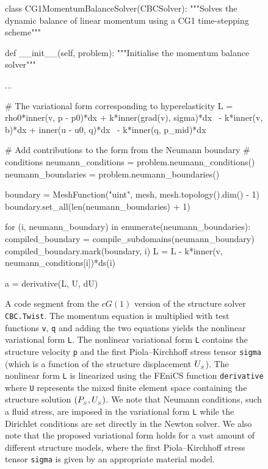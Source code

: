 \begin{figure}
\label{selim:fig:structuresolver}
\caption{A code segment from the $cG(1)$ version of the structure
  solver \texttt{CBC.Twist}.  The momentum equation is multiplied with
  test functions \texttt{v}, \texttt{q} and adding the two equations
  yields the nonlinear variational form \texttt{L}. The nonlinear
  variational form \texttt{L} contains the structure velocity
  \texttt{p} and the first Piola--Kirchhoff stress tensor
  \texttt{sigma} (which is a function of the structure
  displacement $U_{_{S}}$).  The nonlinear form \texttt{L} is
  linearized using the FEniCS function \texttt{derivative} where
  \texttt{U} represents the mixed finite element space containing the
  structure solution $(P_{_{S}}, U_{_{S}})$.  We note that Neumann
  conditions, such a fluid stress, are imposed in the variational form
  \texttt{L} while the Dirichlet conditions are set directly in the
  Newton solver. We also note that the proposed variational form holds
  for a vast amount of different structure models, where the first
  Piola--Kirchhoff stress tensor \texttt{sigma} is given by an
  appropriate material model.  }
\begin{python}
class CG1MomentumBalanceSolver(CBCSolver):
    """Solves the dynamic balance of linear momentum using a CG1
    time-stepping scheme"""

    def __init__(self, problem):
        """Initialise the momentum balance solver"""
   
        ...

        # The variational form corresponding to hyperelasticity
        L = rho0*inner(v, p - p0)*dx + k*inner(grad(v), sigma)*dx \
          - k*inner(v, b)*dx + inner(u - u0, q)*dx \
          - k*inner(q, p_mid)*dx

        # Add contributions to the form from the Neumann boundary
        # conditions
        neumann_conditions = problem.neumann_conditions()
        neumann_boundaries = problem.neumann_boundaries()
        
        boundary = MeshFunction("uint", mesh, mesh.topology().dim() - 1)
        boundary.set_all(len(neumann_boundaries) + 1)

        for (i, neumann_boundary) in enumerate(neumann_boundaries):
            compiled_boundary = compile_subdomains(neumann_boundary)
            compiled_boundary.mark(boundary, i)
            L = L - k*inner(v, neumann_conditions[i])*ds(i)
 
        a = derivative(L, U, dU)
\end{python}
\end{figure}


